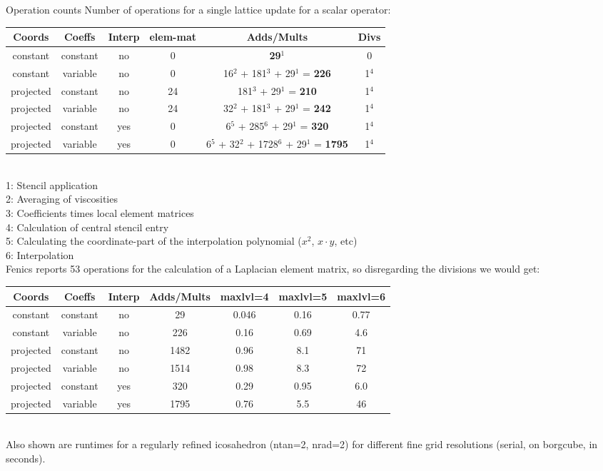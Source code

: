 \documentclass[a4paper,11pt,reqno]{amsart}
\numberwithin{figure}{section}
\numberwithin{table}{section}
\numberwithin{figure}{subsection}
\begin{document}
\begin{section}{Operation counts}
%
Number of operations for a single lattice update for a scalar operator:\\
%
\begin{tabular}{c|c|c|c|c|c}
 \textbf{Coords} & \textbf{Coeffs} & \textbf{Interp} & \textbf{elem-mat} & \textbf{Adds/Mults} & \textbf{Divs} \\
 \hline
 constant  & constant & no  & 0  & \textbf{29}$^1$                                    & 0     \\
 constant  & variable & no  & 0  & 16$^2$ + 181$^3$ + 29$^1$ = \textbf{226}           & 1$^4$ \\
 projected & constant & no  & 24 & 181$^3$ + 29$^1$ = \textbf{210}                    & 1$^4$ \\
 projected & variable & no  & 24 & 32$^2$ + 181$^3$ + 29$^1$ = \textbf{242}           & 1$^4$ \\
 projected & constant & yes & 0  & 6$^5$ + 285$^6$ + 29$^1$ = \textbf{320}            & 1$^4$ \\
 projected & variable & yes & 0  & 6$^5$ + 32$^2$ + 1728$^6$ + 29$^1$ = \textbf{1795} & 1$^4$ \\
\end{tabular}\\
%
1: Stencil application\\
2: Averaging of viscosities\\
3: Coefficients times local element matrices\\
4: Calculation of central stencil entry\\
5: Calculating the coordinate-part of the interpolation polynomial ($x^2$, $x \cdot y$, etc)\\
6: Interpolation\\

Fenics reports 53 operations for the calculation of a Laplacian element matrix, so disregarding the divisions we would get:\\
%
\begin{tabular}{c|c|c|c|c|c|c}
 \textbf{Coords} & \textbf{Coeffs} & \textbf{Interp} & \textbf{Adds/Mults} & \textbf{maxlvl=4} & \textbf{maxlvl=5} & \textbf{maxlvl=6} \\
 \hline
 constant  & constant & no  & 29   & 0.046 & 0.16 & 0.77 \\
 constant  & variable & no  & 226  & 0.16  & 0.69 & 4.6  \\
 projected & constant & no  & 1482 & 0.96  & 8.1  & 71   \\
 projected & variable & no  & 1514 & 0.98  & 8.3  & 72   \\
 projected & constant & yes & 320  & 0.29  & 0.95 & 6.0  \\
 projected & variable & yes & 1795 & 0.76  & 5.5  & 46   \\
\end{tabular}\\
Also shown are runtimes for a regularly refined icosahedron (ntan=2, nrad=2) for different fine grid resolutions (serial, on borgcube, in seconds).


\end{section}
\end{document}
